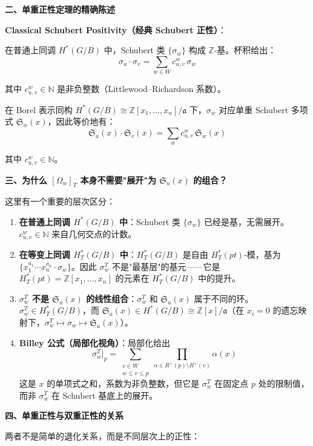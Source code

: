 \textbf{二、单重正性定理的精确陈述}

\textbf{Classical Schubert Positivity（经典 Schubert 正性）}：

在普通上同调 $H^*(G/B)$ 中，Schubert 类 $\{\sigma_w\}$ 构成 $\mathbb{Z}$-基。杯积给出：
$$\sigma_u \cdot \sigma_v = \sum_{w \in W} c_{u,v}^w \, \sigma_w$$

其中 $c_{u,v}^w \in \mathbb{N}$ 是非负整数（Littlewood--Richardson 系数）。

在 Borel 表示同构 $H^*(G/B) \cong \mathbb{Z}[x_1,\ldots,x_n]/\mathfrak{a}$ 下，$\sigma_w$ 对应单重 Schubert 多项式 $\mathfrak{S}_w(x)$，因此等价地有：
$$\mathfrak{S}_u(x) \cdot \mathfrak{S}_v(x) = \sum_w c_{u,v}^w \, \mathfrak{S}_w(x)$$

其中 $c_{u,v}^w \in \mathbb{N}$。

\textbf{三、为什么 $[\Omega_w]_T$ 本身不需要"展开"为 $\mathfrak{S}_u(x)$ 的组合？}

这里有一个重要的层次区分：

\begin{enumerate}
\item \textbf{在普通上同调 $H^*(G/B)$ 中}：Schubert 类 $\{\sigma_w\}$ 已经是基，无需展开。$c_{u,v}^w \in \mathbb{N}$ 来自几何交点的计数。

\item \textbf{在等变上同调 $H_T^*(G/B)$ 中}：$H_T^*(G/B)$ 是自由 $H_T^*(pt)$-模，基为 $\{x_1^{a_1}\cdots x_n^{a_n} \cdot \sigma_w\}$。因此 $\sigma_w^T$ 不是"最基层"的基元——它是 $H_T^*(pt) = \mathbb{Z}[x_1,\ldots,x_n]$ 的元素在 $H_T^*(G/B)$ 中的提升。

\item \textbf{$\sigma_w^T$ 不是 $\mathfrak{S}_u(x)$ 的线性组合}：$\sigma_w^T$ 和 $\mathfrak{S}_u(x)$ 属于不同的环。$\sigma_w^T \in H_T^*(G/B)$，而 $\mathfrak{S}_u(x) \in H^*(G/B) \cong \mathbb{Z}[x]/\mathfrak{a}$（在 $x_i = 0$ 的遗忘映射下，$\sigma_w^T \mapsto \sigma_w \mapsto \mathfrak{S}_u(x)$）。

\item \textbf{Billey 公式（局部化视角）}：局部化给出
$$\sigma_w^T|_p = \sum_{\substack{v \in W \\ w \leq v \leq p}} \prod_{\alpha \in R^+(p) \setminus R^+(v)} \alpha(x)$$
这是 $x$ 的单项式之和，系数为非负整数，但它是 $\sigma_w^T$ 在固定点 $p$ 处的限制值，而非 $\sigma_w^T$ 在 Schubert 基底上的展开。
\end{enumerate}

\textbf{四、单重正性与双重正性的关系}

两者不是简单的退化关系，而是不同层次上的正性：

